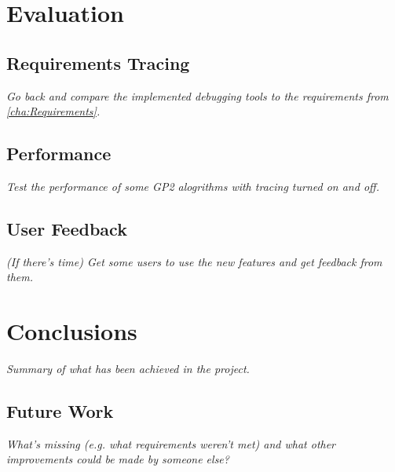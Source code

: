 \documentclass[authoryearcitations]{UoYCSproject}
\begin{document}
\clearpage


\chapter{Evaluation}
\label{cha:Evaluation}

\section{Requirements Tracing}
\label{sec:RequirementsTracing}

\emph{Go back and compare the implemented debugging tools to the requirements
from \autoref{cha:Requirements}.}


\section{Performance}
\label{sec:Performance}

\emph{Test the performance of some GP2 alogrithms with tracing turned on and off.}


\section{User Feedback}
\label{sec:UserFeedback}

\emph{(If there's time) Get some users to use the new features and get feedback
from them.}

\clearpage


\chapter{Conclusions}
\label{cha:Conclusions}

\emph{Summary of what has been achieved in the project.}


\section{Future Work}
\label{sec:FutureWork}

\emph{What's missing (e.g. what requirements weren't met) and what other
improvements could be made by someone else?}

\clearpage



\end{document}
